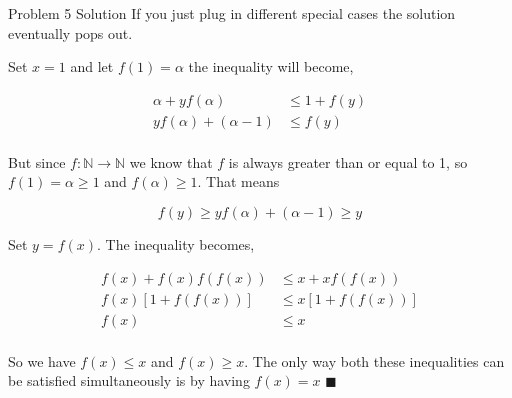 \documentclass{article}
\begin{document}
\begin{solution}{Problem 5 Solution}
If you just plug in different special cases the solution eventually pops out. \vspace{0.2cm}

Set $x=1$ and let $f(1) = \alpha$ the inequality will become,

\[
\begin{aligned}
\alpha + yf(\alpha) &\leq 1 + f(y)\\
yf(\alpha) + (\alpha - 1) &\leq f(y)\\
\end{aligned}
\]

But since $f : \mathbb{N} \rightarrow \mathbb{N}$ we know that $f$ is always greater than or equal to 1, so $f(1) = \alpha \geq 1$ and $f(\alpha) \geq 1$. That means

$$
f(y) \geq yf(\alpha) + (\alpha - 1) \geq y
$$

Set $y = f(x)$. The inequality becomes,

\[
\begin{aligned}
f(x) + f(x)f(f(x)) &\leq x + xf(f(x))\\
f(x)[1 + f(f(x))] &\leq x[1 + f(f(x))]\\
f(x) &\leq x\\
\end{aligned}
\]

So we have $f(x) \leq x$ and $f(x) \geq x$. The only way both these inequalities can be satisfied simultaneously is by having $\boxed{f(x) = x}$ $\blacksquare$

\end{solution}
\end{document}

